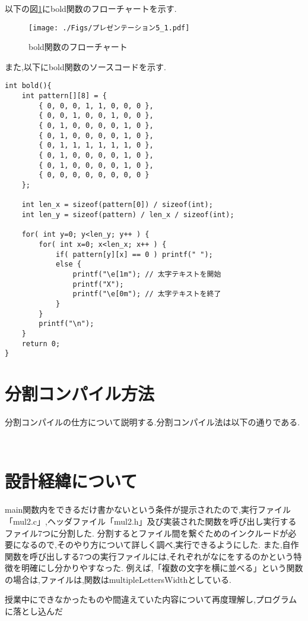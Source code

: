 \documentclass[uplatex,dvipdfmx]{jsarticle}
\begin{document}
以下の図\ref{fig:bold関数のフローチャート}にbold関数のフローチャートを示す.
\newpage
\begin{figure}[h]
    \centering
    \texttt{[image: ./Figs/プレゼンテーション5\_1.pdf]}
    \caption{bold関数のフローチャート}
    \label{fig:bold関数のフローチャート}
\end{figure}

また,以下にbold関数のソースコードを示す.
\begin{lstlisting}[firstnumber = 1, caption=太字の装飾をつける, label=code]
int bold(){
    int pattern[][8] = {
        { 0, 0, 0, 1, 1, 0, 0, 0 },
        { 0, 0, 1, 0, 0, 1, 0, 0 },
        { 0, 1, 0, 0, 0, 0, 1, 0 },
        { 0, 1, 0, 0, 0, 0, 1, 0 },
        { 0, 1, 1, 1, 1, 1, 1, 0 },
        { 0, 1, 0, 0, 0, 0, 1, 0 },
        { 0, 1, 0, 0, 0, 0, 1, 0 },
        { 0, 0, 0, 0, 0, 0, 0, 0 }
    };

    int len_x = sizeof(pattern[0]) / sizeof(int);
    int len_y = sizeof(pattern) / len_x / sizeof(int);

    for( int y=0; y<len_y; y++ ) {
        for( int x=0; x<len_x; x++ ) {
            if( pattern[y][x] == 0 ) printf(" ");
            else { 
                printf("\e[1m"); // 太字テキストを開始
                printf("X");
                printf("\e[0m"); // 太字テキストを終了
            }
        }
        printf("\n");
    }
    return 0;
}
\end{lstlisting}

\section{分割コンパイル方法}
分割コンパイルの仕方について説明する.分割コンパイル法は以下の通りである.
\begin{lstlisting}[firstnumber = 1, caption=分割コンパイル法, label=code]


\end{lstlisting}

\section{設計経緯について}
main関数内をできるだけ書かないという条件が提示されたので,実行ファイル「mul2.c」,ヘッダファイル「mul2.h」及び実装された関数を呼び出し実行するファイル7つに分割した.
分割するとファイル間を繋ぐためのインクルードが必要になるので,そのやり方について詳しく調べ,実行できるようにした.
また,自作関数を呼び出しする7つの実行ファイルには,それぞれがなにをするのかという特徴を明確にし分かりやすなった.
例えば,「複数の文字を横に並べる」という関数の場合は,ファイルは,関数はmultipleLettersWidthとしている.

授業中にできなかったものや間違えていた内容について再度理解し,プログラムに落とし込んだ
\end{document}
